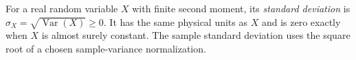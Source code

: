 
For a real random variable $X$ with finite second moment, its \emph{standard deviation} is $\sigma_X=\sqrt{\operatorname{Var}(X)}\ge0$. It has the same physical units as $X$ and is zero exactly when $X$ is almost surely constant. The sample standard deviation uses the square root of a chosen sample-variance normalization.
